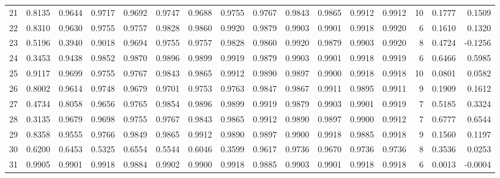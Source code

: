 \begin{tabular}{lrrrrrrrrrrrrrrr}
21  &      0.8135 &  0.9644 &  0.9717 &  0.9692 &  0.9747 &  0.9688 &  0.9755 &  0.9767 &  0.9843 &  0.9865 &   0.9912 &     0.9912 &     10 &                    0.1777 &                     0.1509 \\
22  &      0.8310 &  0.9630 &  0.9755 &  0.9757 &  0.9828 &  0.9860 &  0.9920 &  0.9879 &  0.9903 &  0.9901 &   0.9918 &     0.9920 &      6 &                    0.1610 &                     0.1320 \\
23  &      0.5196 &  0.3940 &  0.9018 &  0.9694 &  0.9755 &  0.9757 &  0.9828 &  0.9860 &  0.9920 &  0.9879 &   0.9903 &     0.9920 &      8 &                    0.4724 &                    -0.1256 \\
24  &      0.3453 &  0.9438 &  0.9852 &  0.9870 &  0.9896 &  0.9899 &  0.9919 &  0.9879 &  0.9903 &  0.9901 &   0.9918 &     0.9919 &      6 &                    0.6466 &                     0.5985 \\
25  &      0.9117 &  0.9699 &  0.9755 &  0.9767 &  0.9843 &  0.9865 &  0.9912 &  0.9890 &  0.9897 &  0.9900 &   0.9918 &     0.9918 &     10 &                    0.0801 &                     0.0582 \\
26  &      0.8002 &  0.9614 &  0.9748 &  0.9679 &  0.9701 &  0.9753 &  0.9763 &  0.9847 &  0.9867 &  0.9911 &   0.9895 &     0.9911 &      9 &                    0.1909 &                     0.1612 \\
27  &      0.4734 &  0.8058 &  0.9656 &  0.9765 &  0.9854 &  0.9896 &  0.9899 &  0.9919 &  0.9879 &  0.9903 &   0.9901 &     0.9919 &      7 &                    0.5185 &                     0.3324 \\
28  &      0.3135 &  0.9679 &  0.9698 &  0.9755 &  0.9767 &  0.9843 &  0.9865 &  0.9912 &  0.9890 &  0.9897 &   0.9900 &     0.9912 &      7 &                    0.6777 &                     0.6544 \\
29  &      0.8358 &  0.9555 &  0.9766 &  0.9849 &  0.9865 &  0.9912 &  0.9890 &  0.9897 &  0.9900 &  0.9918 &   0.9885 &     0.9918 &      9 &                    0.1560 &                     0.1197 \\
30  &      0.6200 &  0.6453 &  0.5325 &  0.6554 &  0.5544 &  0.6046 &  0.3599 &  0.9617 &  0.9736 &  0.9670 &   0.9736 &     0.9736 &      8 &                    0.3536 &                     0.0253 \\
31  &      0.9905 &  0.9901 &  0.9918 &  0.9884 &  0.9902 &  0.9900 &  0.9918 &  0.9885 &  0.9903 &  0.9901 &   0.9918 &     0.9918 &      6 &                    0.0013 &                    -0.0004 \\

\end{tabular}
